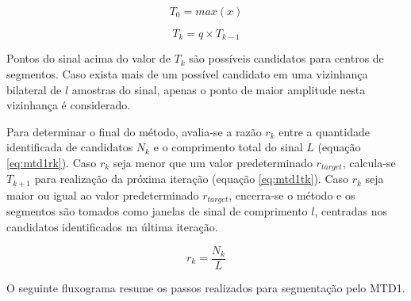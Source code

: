 \documentclass[
	12pt,				%
	openright,			%
	oneside,
	a4paper,			%
	english,			%
	francais,			%
	spanish,			%
	brazil				%
	]{abntex2}
\begin{document}
\begin{equation}
\label{eq:mtd1t0}
  T_0 = max(x)
\end{equation}

\begin{equation}
\label{eq:mtd1tk}
  T_k = q \times T_{k-1}
\end{equation}

	Pontos do sinal acima do valor de $T_k$ são possíveis candidatos para centros de segmentos. Caso exista mais de um possível candidato em uma vizinhança bilateral de $l$ amostras do sinal, apenas o ponto de maior amplitude nesta vizinhança é considerado.
	
	Para determinar o final do método, avalia-se a razão $r_k$ entre a quantidade identificada de candidatos $N_{k}$ e o comprimento total do sinal $L$ (equação \ref{eq:mtd1rk}). Caso $r_k$ seja menor que um valor predeterminado $r_{target}$, calcula-se $T_{k+1}$ para realização da próxima iteração (equação \ref{eq:mtd1tk}). Caso $r_k$ seja maior ou igual ao valor predeterminado $r_{target}$, encerra-se o método e os segmentos são tomados como janelas de sinal de comprimento $l$, centradas nos candidatos identificados na última iteração.
	
\begin{equation}
\label{eq:mtd1rk}
  r_k = \frac{N_{k}}{L} 
\end{equation}
	
	O seguinte fluxograma resume os passos realizados para segmentação pelo MTD1.
	
	
\end{document}
